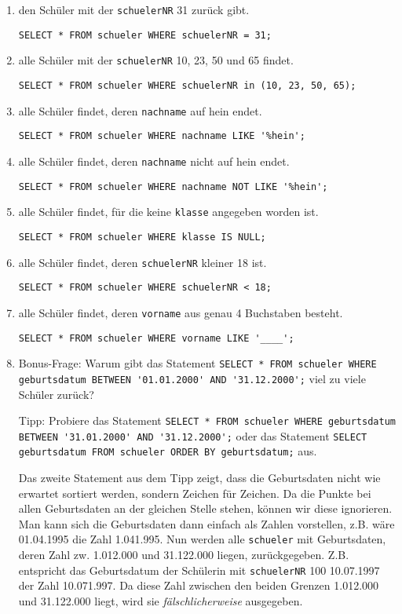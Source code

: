 \begin{Answer}[ref=Where]
	\begin{enumerate}
		\item den Schüler mit der \lstinline!schuelerNR! 31 zurück gibt.

		\lstinline!SELECT * FROM schueler WHERE schuelerNR = 31;!
		\item alle Schüler mit der \lstinline!schuelerNR! 10, 23, 50 und 65 findet.

		\lstinline!SELECT * FROM schueler WHERE schuelerNR in (10, 23, 50, 65);!
		\item alle Schüler findet, deren \lstinline!nachname! auf hein endet.

		\lstinline!SELECT * FROM schueler WHERE nachname LIKE '%hein';!
		\item alle Schüler findet, deren \lstinline!nachname! nicht auf hein endet.

		\lstinline!SELECT * FROM schueler WHERE nachname NOT LIKE '%hein';!
		\item alle Schüler findet, für die keine \lstinline!klasse! angegeben worden ist.

		\lstinline!SELECT * FROM schueler WHERE klasse IS NULL;!

		\item alle Schüler findet, deren \lstinline!schuelerNR! kleiner 18 ist.

		\lstinline!SELECT * FROM schueler WHERE schuelerNR < 18;!
		\item alle Schüler findet, deren \lstinline!vorname! aus genau 4 Buchstaben besteht.

		\lstinline!SELECT * FROM schueler WHERE vorname LIKE '____';!
		\item Bonus-Frage: Warum gibt das Statement \lstinline!SELECT * FROM schueler WHERE geburtsdatum BETWEEN '01.01.2000' AND '31.12.2000';! viel zu viele Schüler zurück?

		Tipp: Probiere das Statement \lstinline!SELECT * FROM schueler WHERE geburtsdatum BETWEEN '31.01.2000' AND '31.12.2000';! oder das Statement \lstinline!SELECT geburtsdatum FROM schueler ORDER BY geburtsdatum;! aus.

		Das zweite Statement aus dem Tipp zeigt, dass die Geburtsdaten nicht wie erwartet sortiert werden, sondern Zeichen für Zeichen. Da die Punkte bei allen Geburtsdaten an der gleichen Stelle stehen, können wir diese ignorieren. Man kann sich die Geburtsdaten dann einfach als Zahlen vorstellen, z.B. wäre 01.04.1995 die Zahl 1.041.995. Nun werden alle \lstinline!schueler! mit Geburtsdaten, deren Zahl zw. 1.012.000 und 31.122.000 liegen, zurückgegeben. Z.B. entspricht das Geburtsdatum der Schülerin mit \lstinline!schuelerNR! 100 10.07.1997 der Zahl 10.071.997. Da diese Zahl zwischen den beiden Grenzen 1.012.000 und 31.122.000 liegt, wird sie \textit{fälschlicherweise} ausgegeben.
	\end{enumerate}
\end{Answer}